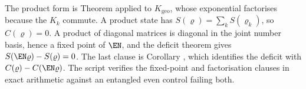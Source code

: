 The product form is Theorem  applied to $K_{\mathrm{geo}}$, whose exponential factorises because the $K_k$ commute. A product state has $S(\varrho) = \sum_k S(\varrho_k)$, so $C(\varrho) = 0$. A product of diagonal matrices is diagonal in the joint number basis, hence a fixed point of $\EN$, and the deficit theorem gives $S(\EN\varrho) - S(\varrho) = 0$. The last clause is Corollary , which identifies the deficit with $C(\varrho) - C(\EN\varrho)$. The script verifies the fixed-point and factorisation clauses in exact arithmetic against an entangled even control failing both.
